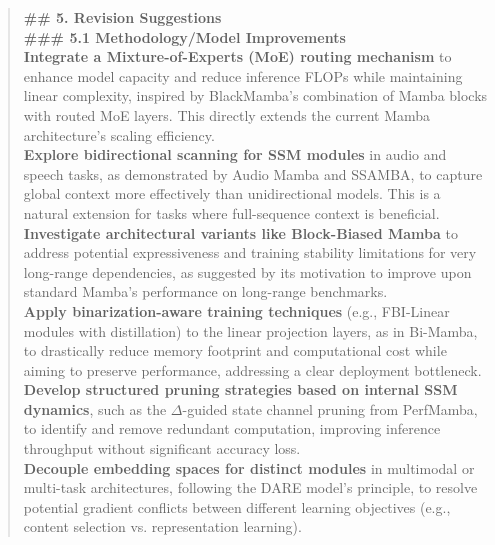 \begin{quote}
\begin{tcolorbox}[breakable,colback=almond!20!white, colframe=almond!60!black, title=\textbf{Case Study (Mamba: Linear-Time Sequence Modeling with Selective State Spaces)}]
        \textbf{\#\# 5. Revision Suggestions}\\
        
        \textbf{\#\#\# 5.1 Methodology/Model Improvements}\\
        \textbf{Integrate a Mixture-of-Experts (MoE) routing mechanism} to enhance model capacity and reduce inference FLOPs while maintaining linear complexity, inspired by BlackMamba's combination of Mamba blocks with routed MoE layers. This directly extends the current Mamba architecture's scaling efficiency.\\
        \textbf{Explore bidirectional scanning for SSM modules} in audio and speech tasks, as demonstrated by Audio Mamba and SSAMBA, to capture global context more effectively than unidirectional models. This is a natural extension for tasks where full-sequence context is beneficial.\\
        \textbf{Investigate architectural variants like Block-Biased Mamba} to address potential expressiveness and training stability limitations for very long-range dependencies, as suggested by its motivation to improve upon standard Mamba's performance on long-range benchmarks.\\
        \textbf{Apply binarization-aware training techniques} (e.g., FBI-Linear modules with distillation) to the linear projection layers, as in Bi-Mamba, to drastically reduce memory footprint and computational cost while aiming to preserve performance, addressing a clear deployment bottleneck.\\
        \textbf{Develop structured pruning strategies based on internal SSM dynamics}, such as the $\Delta$-guided state channel pruning from PerfMamba, to identify and remove redundant computation, improving inference throughput without significant accuracy loss.\\
        \textbf{Decouple embedding spaces for distinct modules} in multimodal or multi-task architectures, following the DARE model's principle, to resolve potential gradient conflicts between different learning objectives (e.g., content selection vs. representation learning).\\


\end{tcolorbox}
\end{quote}
